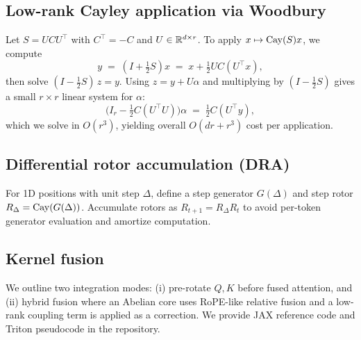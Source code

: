 \label{sec:efficiency}
\subsection{Low-rank Cayley application via Woodbury}
Let $S=UCU^\top$ with $C^\top=-C$ and $U\in\mathbb{R}^{d\times r}$.
To apply $x\mapsto \mathrm{Cay}(S)x$, we compute
\begin{equation}
  y \;=\; (I+\tfrac12 S)x \;=\; x + \tfrac12 U C (U^\top x),
\end{equation}
then solve $(I-\tfrac12 S)\,z = y$.
Using $z=y+U\alpha$ and multiplying by $(I-\tfrac12 S)$ gives a small $r\times r$ linear system for $\alpha$:
\begin{equation}
  \Big(I_r - \tfrac12 C (U^\top U)\Big)\alpha \;=\; \tfrac12 C (U^\top y),
\end{equation}
which we solve in $O(r^3)$, yielding overall $O(dr + r^3)$ cost per application.

\subsection{Differential rotor accumulation (DRA)}
For 1D positions with unit step $\Delta$, define a step generator $G(\Delta)$ and step rotor $R_\Delta=\mathrm{Cay}(G(\Delta))$.
Accumulate rotors as $R_{t+1}=R_\Delta R_t$ to avoid per-token generator evaluation and amortize computation.

\subsection{Kernel fusion}
We outline two integration modes:
(i) pre-rotate $Q,K$ before fused attention, and (ii) hybrid fusion where an Abelian core uses RoPE-like relative fusion and a low-rank coupling term is applied as a correction.
We provide JAX reference code and Triton pseudocode in the repository.
